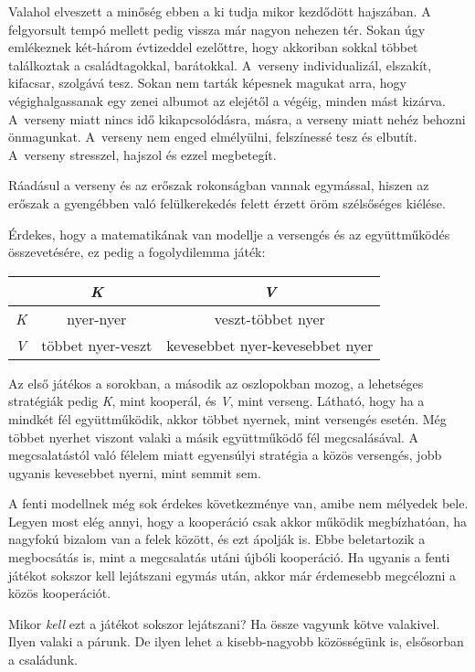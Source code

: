 \documentclass[12pt,a4paper]{article}
\begin{document}
Valahol elveszett a minőség ebben a ki tudja mikor kezdődött hajszában.
A felgyorsult tempó mellett pedig vissza már nagyon nehezen tér.
Sokan úgy emlékeznek két-három évtizeddel ezelőttre, hogy akkoriban sokkal többet találkoztak a családtagokkal, barátokkal.
A~verseny individualizál, elszakít, kifacsar, szolgává tesz.
Sokan nem tarták képesnek magukat arra, hogy végighalgassanak egy zenei albumot az elejétől a végéig, minden mást kizárva.
A~verseny miatt nincs idő kikapcsolódásra, másra, a verseny miatt nehéz behozni önmagunkat.
A~verseny nem enged elmélyülni, felszínessé tesz és elbutít.
A~verseny stresszel, hajszol és ezzel megbetegít.

Ráadásul a verseny és az erőszak rokonságban vannak egymással, hiszen az erőszak a gyengébben való felülkerekedés felett érzett öröm szélsőséges kiélése.

Érdekes, hogy a matematikának van modellje a versengés és az együttműködés összevetésére, ez pedig a fogolydilemma játék:

\begin{center}
\begin{tabular}{l@{\ \vline\ }cc}
  & \emph{K}      & \emph{V}\\
\hline
\emph{K} & nyer-nyer & veszt-többet nyer\\
\emph{V} & többet nyer-veszt & kevesebbet nyer-kevesebbet nyer
\end{tabular}
\end{center}

Az első játékos a sorokban, a második az oszlopokban mozog, a lehetséges stratégiák pedig \emph{K}, mint kooperál, és \emph{V}, mint verseng.
Látható, hogy ha a mindkét fél együttműködik, akkor többet nyernek, mint versengés esetén.
Még többet nyerhet viszont valaki a másik együttműködő fél megcsalásával.
A megcsalatástól való félelem miatt egyensúlyi stratégia a közös versengés, jobb ugyanis kevesebbet nyerni, mint semmit sem.

A fenti modellnek még sok érdekes következménye van, amibe nem mélyedek bele.
Legyen most elég annyi, hogy a kooperáció csak akkor működik megbízhatóan, ha nagyfokú bizalom van a felek között, és ezt ápolják is.
Ebbe beletartozik a megbocsátás is, mint a megcsalatás utáni újbóli kooperáció.
Ha ugyanis a fenti játékot sokszor kell lejátszani egymás után, akkor már érdemesebb megcélozni a közös kooperációt.

Mikor \emph{kell} ezt a játékot sokszor lejátszani?
Ha össze vagyunk kötve valakivel.
Ilyen valaki a párunk.
De ilyen lehet a kisebb-nagyobb közösségünk is, elsősorban a családunk.
\end{document}
